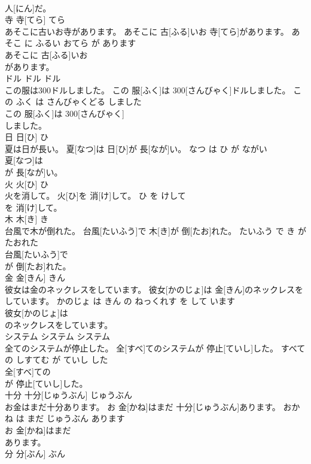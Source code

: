 \documentclass[8pt]{extreport}
\begin{document}
\begin{CJK}{UTF8}{min}
\\	人[にん]だ。		
\\	寺	寺[てら]	てら	
\\	あそこに古いお寺があります。	あそこに 古[ふる]いお 寺[てら]があります。	あそこ に ふるい おてら が あります	
\\	あそこに 古[ふる]いお
\\	があります。		
\\	ドル	ドル	ドル	
\\	この服は300ドルしました。	この 服[ふく]は 300[さんびゃく]ドルしました。	この ふく は さんびゃくどる しました	
\\	この 服[ふく]は 300[さんびゃく]
\\	しました。		
\\	日	日[ひ]	ひ	
\\	夏は日が長い。	夏[なつ]は 日[ひ]が 長[なが]い。	なつ は ひ が ながい	
\\	夏[なつ]は
\\	が 長[なが]い。		
\\	火	火[ひ]	ひ	
\\	火を消して。	火[ひ]を 消[け]して。	ひ を けして	
\\	を 消[け]して。		
\\	木	木[き]	き	
\\	台風で木が倒れた。	台風[たいふう]で 木[き]が 倒[たお]れた。	たいふう で き が たおれた	
\\	台風[たいふう]で
\\	が 倒[たお]れた。		
\\	金	金[きん]	きん	
\\	彼女は金のネックレスをしています。	彼女[かのじょ]は 金[きん]のネックレスをしています。	かのじょ は きん の ねっくれす を して います	
\\	彼女[かのじょ]は
\\	のネックレスをしています。		
\\	システム	システム	システム	
\\	全てのシステムが停止した。	全[すべ]てのシステムが 停止[ていし]した。	すべて の しすてむ が ていし した	
\\	全[すべ]ての
\\	が 停止[ていし]した。		
\\	十分	十分[じゅうぶん]	じゅうぶん	
\\	お金はまだ十分あります。	お 金[かね]はまだ 十分[じゅうぶん]あります。	おかね は まだ じゅうぶん あります	
\\	お 金[かね]はまだ
\\	あります。		
\\	分	分[ぶん]	ぶん	

\end{CJK}
\end{document}
